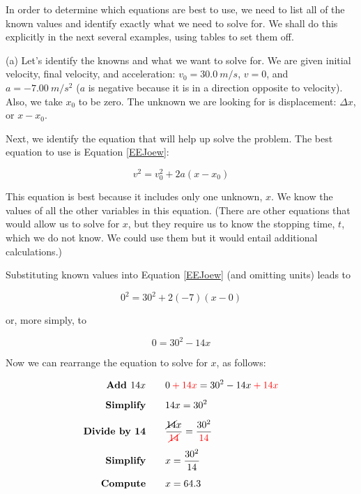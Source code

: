 \documentclass[main-ap-physics.tex]{subfiles}
\begin{document}
In order to determine which equations are best to use, we need to list all of the known values and identify exactly what we need to solve for. We shall do this explicitly in the next several examples, using tables to set them off.

\vspace{1em}

(a) Let's identify the knowns and what we want to solve for. We are given initial velocity, final velocity, and acceleration: $v_0 = \SI{30.0}{m/s}$, $v= 0$, and $a = \SI{-7.00}{m/s^2}$ ($a$ is negative because it is in a direction opposite to velocity). Also, we take $x_0$ to be zero. The unknown we are looking for is displacement: $\Delta x$, or $x-x_0$.

\vspace{1em}

Next, we identify the equation that will help up solve the problem. The best equation to use is Equation \eqref{EEJoew}:

\begin{equation*}
    v^2 = v_0^2 + 2a(x-x_0)
\end{equation*}

This equation is best because it includes only one unknown, $x$. We know the values of all the other variables in this equation. (There are other equations that would allow us to solve for $x$, but they require us to know the stopping time, $t$, which we do not know. We could use them but it would entail additional calculations.)

\vspace{1em}

Substituting known values into Equation \eqref{EEJoew} (and omitting units) leads to 

\begin{equation*}
    0^2 = 30^2 + 2\left(-7\right) \left(x-0\right)
\end{equation*}

or, more simply, to 

\begin{equation*}
    0 = 30^2 - 14 x
\end{equation*}

Now we can rearrange the equation to solve for $x$, as follows:

\begin{align*}
    \textbf{Add $14x$} \qquad & 0 \mathbin{\color{red} +} \textcolor{red}{14x} = 30^2 -14x \mathbin{\color{red} +} \textcolor{red}{14x}\\[1ex]
    \textbf{Simplify} \qquad & 14x = 30^2\\[1ex]
    \textbf{Divide by 14} \qquad & \frac{\cancel{14}x}{\textcolor{red}{\cancel{14}}} = \frac{30^2}{\textcolor{red}{14}}\\[1ex]
    \textbf{Simplify} \qquad & x = \frac{30^2}{14} \\[1ex]
    \textbf{Compute} \qquad & x = 64.3
\end{align*}
\end{document}
